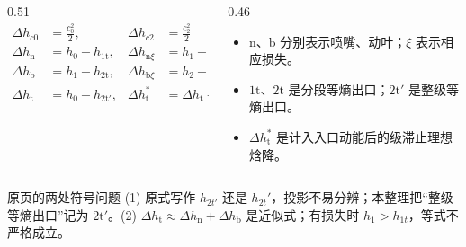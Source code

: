 \begin{frame}[t,shrink]{}
\begin{columns}[T,onlytextwidth]
\begin{column}{0.51\textwidth}
$$
\begin{aligned}
\Delta h_{c0}&=\frac{c_0^2}{2},&
\Delta h_{c2}&=\frac{c_2^2}{2}\\
\Delta h_{\mathrm{n}}&=h_0-h_{1\mathrm{t}},&
\Delta h_{\mathrm{n}\xi}&=h_1-h_{1\mathrm{t}}\\
\Delta h_{\mathrm{b}}&=h_1-h_{2\mathrm{t}},&
\Delta h_{\mathrm{b}\xi}&=h_2-h_{2\mathrm{t}}\\
\Delta h_{\mathrm{t}}&=h_0-h_{2\mathrm{t}'},&
\Delta h_{\mathrm{t}}^*&=\Delta h_{\mathrm{t}}+\Delta h_{c0}
\end{aligned}
$$
\end{column}
\begin{column}{0.46\textwidth}
  \begin{itemize}
    \item \(\mathrm{n}\)、\(\mathrm{b}\) 分别表示喷嘴、动叶；\(\xi\) 表示相应损失。
    \item \(1\mathrm{t}\)、\(2\mathrm{t}\) 是分段等熵出口；\(2\mathrm{t}'\) 是整级等熵出口。
    \item \(\Delta h_{\mathrm{t}}^*\) 是计入入口动能后的级滞止理想焓降。
  \end{itemize}
\end{column}
\end{columns}
\vspace{0.8mm}
\begin{amberbox}{原页的两处符号问题}
\small (1) 原式写作 \(h_{2t'}\) 还是 \(h_{2t}'\)，投影不易分辨；本整理把“整级等熵出口”记为 \(2\mathrm{t}'\)。(2) \(\Delta h_{\mathrm{t}}\approx\Delta h_{\mathrm{n}}+\Delta h_{\mathrm{b}}\) 是近似式；有损失时 \(h_{1}>h_{1t}\)，等式不严格成立。
\end{amberbox}
\end{frame}

